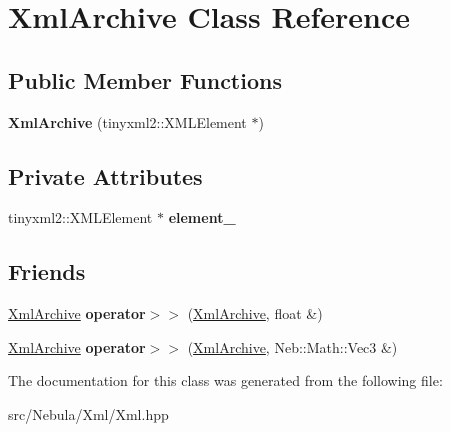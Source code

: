 \hypertarget{classXmlArchive}{\section{\-Xml\-Archive \-Class \-Reference}
\label{classXmlArchive}
}
\subsection*{\-Public \-Member \-Functions}
\begin{DoxyCompactItemize}
\item 
\hypertarget{classXmlArchive_af60507762c0e126c686ba370b502c519}{{\bfseries \-Xml\-Archive} (tinyxml2\-::\-X\-M\-L\-Element $\ast$)}\label{classXmlArchive_af60507762c0e126c686ba370b502c519}

\end{DoxyCompactItemize}
\subsection*{\-Private \-Attributes}
\begin{DoxyCompactItemize}
\item 
\hypertarget{classXmlArchive_a9cc9a554d9a42141a9f51bf9cfa9eca5}{tinyxml2\-::\-X\-M\-L\-Element $\ast$ {\bfseries element\-\_\-}}\label{classXmlArchive_a9cc9a554d9a42141a9f51bf9cfa9eca5}

\end{DoxyCompactItemize}
\subsection*{\-Friends}
\begin{DoxyCompactItemize}
\item 
\hypertarget{classXmlArchive_ac00483f1bd65b3d880d13399bdf383a1}{\hyperlink{classXmlArchive}{\-Xml\-Archive} {\bfseries operator$>$$>$} (\hyperlink{classXmlArchive}{\-Xml\-Archive}, float \&)}\label{classXmlArchive_ac00483f1bd65b3d880d13399bdf383a1}

\item 
\hypertarget{classXmlArchive_ada2eb5f73207ee6133a5f6876c0bbe79}{\hyperlink{classXmlArchive}{\-Xml\-Archive} {\bfseries operator$>$$>$} (\hyperlink{classXmlArchive}{\-Xml\-Archive}, \-Neb\-::\-Math\-::\-Vec3 \&)}\label{classXmlArchive_ada2eb5f73207ee6133a5f6876c0bbe79}

\end{DoxyCompactItemize}


\-The documentation for this class was generated from the following file\-:\begin{DoxyCompactItemize}
\item 
src/\-Nebula/\-Xml/\-Xml.\-hpp\end{DoxyCompactItemize}
